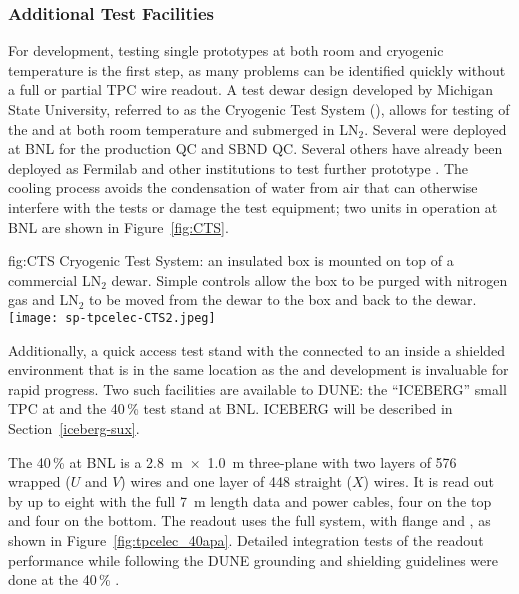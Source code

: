 \subsubsection{Additional Test Facilities}
\label{sec:fdsp-tpcelec-qa-facilities-additional}

For  development, testing single prototypes at both room and cryogenic temperature is the first 
step, as many problems can be identified quickly without a full or partial TPC wire readout. A test dewar 
design developed by Michigan State University, referred to as the Cryogenic Test System (), allows for
testing of the  and  at both room temperature and submerged in LN$_2$. Several
 were deployed at BNL for the  production  QC and SBND  QC. Several
others have already been deployed as Fermilab and other institutions to test further prototype .
The  cooling process avoids the condensation of water from air that can otherwise interfere with the 
tests or damage the test equipment; two  units in operation at BNL are shown in Figure~\ref{fig:CTS}.

\begin{dunefigure}
{fig:CTS}
{Cryogenic Test System: an insulated box is mounted on top of a commercial LN$_2$ dewar.  Simple controls allow the box to be purged with nitrogen gas and LN$_2$ to be moved from the dewar to the box and back to the dewar.}
\texttt{[image: sp-tpcelec-CTS2.jpeg]}
\end{dunefigure}

Additionally, a quick access test stand with the  connected to an  inside a shielded 
environment that is in the same location as the  and  development is invaluable 
for rapid progress.  Two such facilities are available to DUNE: the ``ICEBERG'' small TPC at \fnal and the 
\num{40}\,\%  test stand at BNL. ICEBERG will be described in Section~\ref{iceberg-sux}.

The \num{40}\,\%  at BNL is a \SI{2.8}{m}~$\times$~\SI{1.0}{m} three-plane  with two 
layers of \num{576} wrapped ($U$ and $V$) wires and one layer of \num{448} straight ($X$) wires. It is read 
out by up to eight  with the full \SI{7}{m}  length data and  power cables, 
four on the top and four on the bottom. The readout uses the full  system, with  flange 
and , as shown in Figure~\ref{fig:tpcelec_40apa}. Detailed integration tests of the 
 readout performance while following the DUNE grounding and shielding guidelines were done at the 
\num{40}\,\% .

